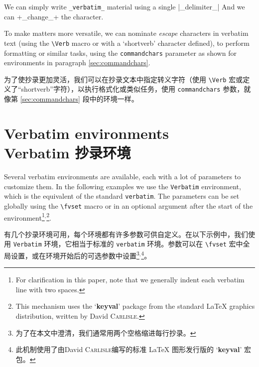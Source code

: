 \documentclass[twoside]{article}
\newcommand\cs[1]{\texttt{\textbackslash#1}}
\newcommand\verbatimTxt{抄录}
\begin{document}

\begin{SideBySideExample}
  \DefineShortVerb{\|}
  We can simply write \Verb+_verbatim_+
  material using a single |_delimiter_|
  \UndefineShortVerb{\|}
  \DefineShortVerb{\+}
  And we can +_change_+ the character.
\end{SideBySideExample}

To make matters more versatile, we can nominate \emph{escape} characters
in verbatim text (using the \cs{Verb} macro or with a `shortverb' character
defined), to perform formatting or similar tasks, using the
\texttt{commandchars} parameter as shown for environments in paragraph
\ref{sec:commandchars}.

为了使抄录更加灵活，我们可以在抄录文本中指定转义字符（使用 \cs{Verb} 宏或定义了“shortverb”字符），以执行格式化或类似任务，使用 \texttt{commandchars} 参数，就像第 \ref{sec:commandchars} 段中的环境一样。

\section{Verbatim environments\\Verbatim 抄录环境}

Several verbatim environments are available, each with a lot of
parameters to customize them. In the following examples we use the
\texttt{Verbatim} environment, which is the equivalent of the standard
\texttt{verbatim}. The parameters can be set globally using the \cs{fvset}
macro or in an optional argument after the start of the
environment\footnote{For clarification in this paper, note that we
generally indent each verbatim line with two
spaces.}$^,$\footnote{This mechanism uses the
`\textbf{keyval}' package from the standard \LaTeX{} graphics
distribution, written by David \textsc{Carlisle}.}.

有几个抄录环境可用，每个环境都有许多参数可供自定义。在以下示例中，我们使用 \texttt{Verbatim} 环境，它相当于标准的 \texttt{verbatim} 环境。参数可以在 \cs{fvset} 宏中全局设置，或在环境开始后的可选参数中设置\footnote{为了在本文中澄清，我们通常用两个空格缩进每行抄录。}$^,$\footnote{此机制使用了由David \textsc{Carlisle}编写的标准 \LaTeX{} 图形发行版的 `\textbf{keyval}' 宏包。}。
\end{document}
